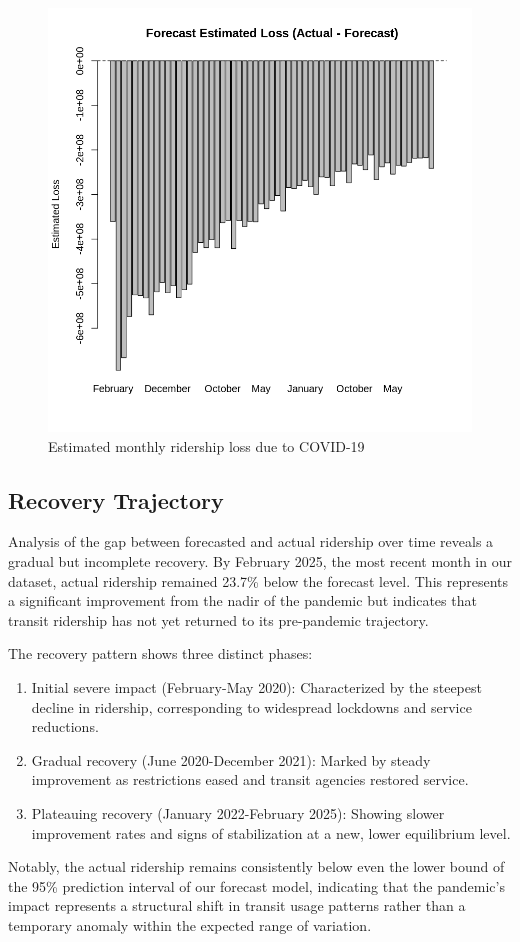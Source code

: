 \documentclass[11pt]{article}
\begin{document}
\begin{figure}[!ht]
\centering
\includegraphics[width=0.525\linewidth]{estimated_loss.png}
\caption{Estimated monthly ridership loss due to COVID-19}
\label{f:loss}
\end{figure}

\subsection{Recovery Trajectory}

Analysis of the gap between forecasted and actual ridership over time reveals a gradual but incomplete recovery. By February 2025, the most recent month in our dataset, actual ridership remained 23.7\% below the forecast level. This represents a significant improvement from the nadir of the pandemic but indicates that transit ridership has not yet returned to its pre-pandemic trajectory.

The recovery pattern shows three distinct phases:
\begin{enumerate}
  \item Initial severe impact (February-May 2020): Characterized by the steepest decline in ridership, corresponding to widespread lockdowns and service reductions.
  \item Gradual recovery (June 2020-December 2021): Marked by steady improvement as restrictions eased and transit agencies restored service.
  \item Plateauing recovery (January 2022-February 2025): Showing slower improvement rates and signs of stabilization at a new, lower equilibrium level.
\end{enumerate}

Notably, the actual ridership remains consistently below even the lower bound of the 95\% prediction interval of our forecast model, indicating that the pandemic's impact represents a structural shift in transit usage patterns rather than a temporary anomaly within the expected range of variation.
\end{document}
